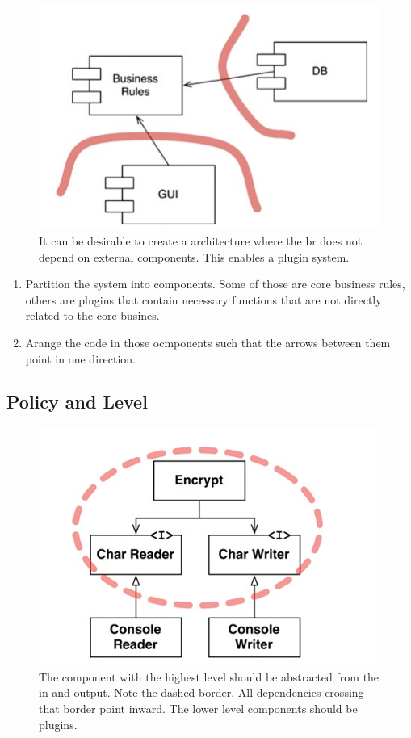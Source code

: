 \documentclass[../Main.tex]{subfiles}
\begin{document}
\begin{figure}[H]
    \centering
    \includegraphics[width=0.75\linewidth]{Images/cleanarch/plugin-br.png}
    \caption{
        It can be desirable to create a architecture where the br does not depend on external components.
        This enables a plugin system.
    }
\end{figure}

\begin{enumerate}
    \item Partition the system into components. Some of those are core business rules, others are plugins that contain necessary functions that are not directly related to the core busines.
    \item Arange the code in those ocmponents such that the arrows between them point in one direction.
\end{enumerate}

\subsection{Policy and Level}


\begin{figure}[H]
    \centering
    \includegraphics[width=0.75\linewidth]{Images/cleanarch/level.png}
    \caption{
        The component with the highest level should be abstracted from the in and output.
        Note the dashed border. All dependencies crossing that border point inward.
        The lower level components should be plugins.
    }
\end{figure}
\end{document}

